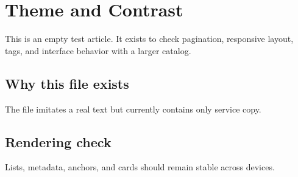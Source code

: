 \section{Theme and Contrast}

This is an empty test article. It exists to check pagination, responsive layout, tags, and interface behavior with a larger catalog.

\subsection{Why this file exists}

The file imitates a real text but currently contains only service copy.

\subsection{Rendering check}

Lists, metadata, anchors, and cards should remain stable across devices.
